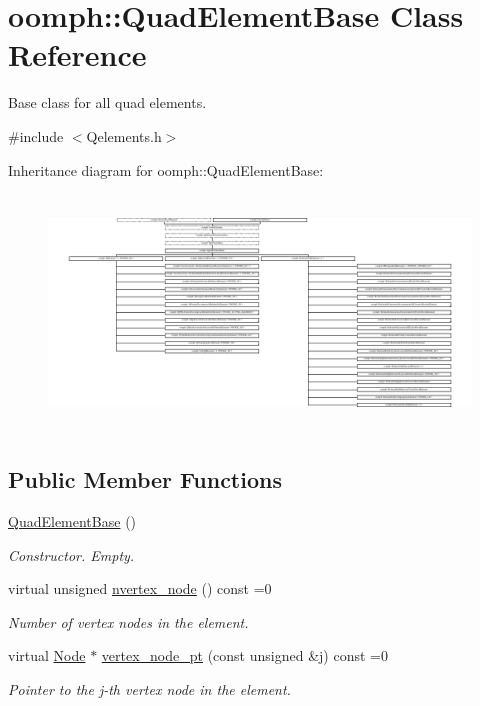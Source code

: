 \hypertarget{classoomph_1_1QuadElementBase}{}\section{oomph\+:\+:Quad\+Element\+Base Class Reference}
\label{classoomph_1_1QuadElementBase}


Base class for all quad elements.  




{\ttfamily \#include $<$Qelements.\+h$>$}

Inheritance diagram for oomph\+:\+:Quad\+Element\+Base\+:\begin{figure}[H]
\begin{center}
\leavevmode
\includegraphics[height=6.272402cm]{classoomph_1_1QuadElementBase}
\end{center}
\end{figure}
\subsection*{Public Member Functions}
\begin{DoxyCompactItemize}
\item 
\hyperlink{classoomph_1_1QuadElementBase_a3b67a4f4ea1a8c5374f3bc4e576cce1c}{Quad\+Element\+Base} ()
\begin{DoxyCompactList}\small\item\em Constructor. Empty. \end{DoxyCompactList}\item 
virtual unsigned \hyperlink{classoomph_1_1QuadElementBase_a84d28d4fad80333d994d9455596b1ae9}{nvertex\+\_\+node} () const =0
\begin{DoxyCompactList}\small\item\em Number of vertex nodes in the element. \end{DoxyCompactList}\item 
virtual \hyperlink{classoomph_1_1Node}{Node} $\ast$ \hyperlink{classoomph_1_1QuadElementBase_a4873d97a8792ddbf951062c1d0069da7}{vertex\+\_\+node\+\_\+pt} (const unsigned \&j) const =0
\begin{DoxyCompactList}\small\item\em Pointer to the j-\/th vertex node in the element. \end{DoxyCompactList}\end{DoxyCompactItemize}
